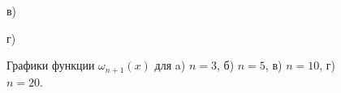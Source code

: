 \documentclass[
11pt,
master, %
subf, %
href, %
colorlinks=true, %
times, %
]{disser}
\begin{document}
\begin{figure}[h]
\begin{minipage}[h]{0.47\linewidth}
\end{minipage}
\vfill
\begin{minipage}[h]{0.47\linewidth}
 в) \\
\end{minipage}
\hfill
\begin{minipage}[h]{0.47\linewidth}
 г) \\
\end{minipage}
\caption{Графики функции $\omega_{n+1}(x)$ для a) $n=3$, б) $n=5$, в) $n=10$, г) $n=20$.}
\label{ris:1}
\end{figure}
\end{document}
